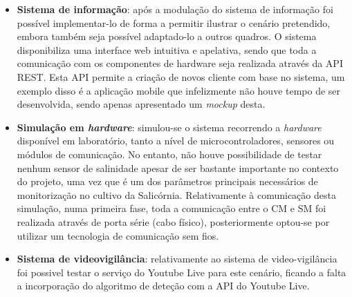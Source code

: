 \begin{itemize}
	
	\item \textbf{Sistema de informação}: após a modulação do sistema de informação foi possível implementar-lo de forma a permitir ilustrar o cenário pretendido, embora também seja possível adaptado-lo a outros quadros. O sistema disponibiliza uma interface web intuitiva e apelativa, sendo que toda a comunicação com os componentes de hardware seja realizada através da API REST. Esta API permite a criação de novos cliente com base no sistema, um exemplo disso é a aplicação mobile que infelizmente não houve tempo de ser desenvolvida, sendo apenas apresentado um \textit{mockup} desta. 
	
	  
	
	\item \textbf{Simulação em \textit{hardware}}: simulou-se o sistema recorrendo a \textit{hardware} disponível em laboratório, tanto a nível de microcontroladores, sensores ou módulos de comunicação. No entanto, não houve possibilidade de testar nenhum sensor de salinidade apesar de ser bastante importante no contexto do projeto, uma vez que é um dos parâmetros principais necessários de monitorização no cultivo da Salicórnia. Relativamente à comunicação desta simulação, numa primeira fase, toda a comunicação entre o \acl{CM} e \acl{SM} foi realizada através de porta série (cabo físico), posteriormente optou-se por utilizar um tecnologia de comunicação sem fios. 
	 
	\item \textbf{Sistema de videovigilância}: relativamente ao sistema de video-vigilância foi possivel testar o serviço do Youtube Live para este cenário, ficando a falta a incorporação do algoritmo de deteção com a API do Youtube Live. 
	

	
\end{itemize}





